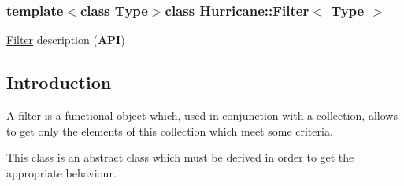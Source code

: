 \subsubsection*{template$<$class Type$>$class Hurricane\-::\-Filter$<$ Type $>$}

\hyperlink{classHurricane_1_1Filter}{Filter} description ({\bfseries A\-P\-I}) 

\hypertarget{classHurricane_1_1Filter_secFilterIntro}{}\subsection{Introduction}\label{classHurricane_1_1Filter_secFilterIntro}
A filter is a functional object which, used in conjunction with a collection, allows to get only the elements of this collection which meet some criteria.

This class is an abstract class which must be derived in order to get the appropriate behaviour.

